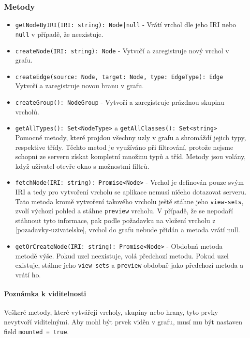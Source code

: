 \subsubsection*{Metody}
\begin{itemize}
  \item \texttt{getNodeByIRI(IRI: string): Node|null} - Vrátí vrchol dle jeho IRI nebo \texttt{null} v případě, že neexistuje.

  \item \texttt{createNode(IRI: string): Node} - Vytvoří a zaregistruje nový vrchol v grafu.
  \item \texttt{createEdge(source: Node, target: Node, type: EdgeType): Edge}\mbox{}\\Vytvoří a zaregistruje novou hranu v grafu.
  \item \texttt{createGroup(): NodeGroup} - Vytvoří a zaregistruje prázdnou skupinu vrcholů.

  \item \texttt{getAllTypes(): Set<NodeType>} a \texttt{getAllClasses(): Set<string>}\mbox{}\\Pomocné metody, které projdou všechny uzly v grafu a shromáždí jejich typy, respektive třídy. Těchto metod je využíváno při filtrování, protože nejsme schopni ze serveru získat kompletní množinu typů a tříd. Metody jsou volány, když uživatel otevře okno s možnostmi filtrů.

  \item \texttt{fetchNode(IRI: string): Promise<Node>} - Vrchol je definován pouze svým IRI a tedy pro vytvoření vrcholu se aplikace nemusí ničeho dotazovat serveru. Tato metoda kromě vytvoření takového vrcholu ještě stáhne jeho \texttt{view-sets}, zvolí výchozí pohled a stáhne \texttt{preview} vrcholu. V případě, že se nepodaří stáhnout tyto informace, pak podle požadavku na vložení vrcholu z \ref{pozadavky-uzivatelske}, vrchol do grafu nebude přidán a metoda vrátí null.

  \item \texttt{getOrCreateNode(IRI: string): Promise<Node>} - Obdobná metoda \\metodě výše. Pokud uzel neexistuje, volá předchozí metodu. Pokud uzel existuje, stáhne jeho \texttt{view-sets} a \texttt{preview} obdobně jako předchozí metoda a vrátí ho.
\end{itemize}

\paragraph{Poznámka k viditelnosti} Veškeré metody, které vytvářejí vrcholy, skupiny nebo hrany, tyto prvky nevytvoří viditelnými. Aby mohl být prvek viděn v grafu, musí mu být nastaven field \texttt{mounted = true}.

